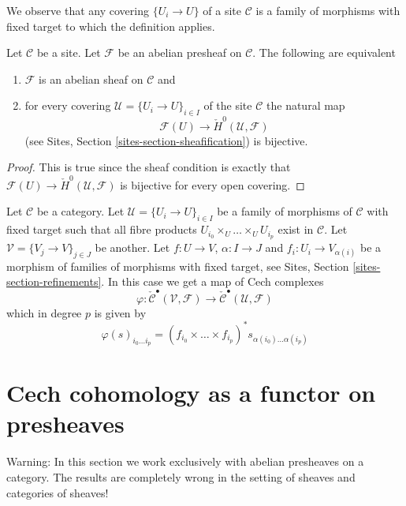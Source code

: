 \noindent
We observe that any covering $\{U_i \to U\}$ of a site $\mathcal{C}$
is a family of morphisms with fixed target to which the definition applies.

\begin{lemma}
\label{lemma-cech-h0}
Let $\mathcal{C}$ be a site.
Let $\mathcal{F}$ be an abelian presheaf on $\mathcal{C}$.
The following are equivalent
\begin{enumerate}
\item $\mathcal{F}$ is an abelian sheaf on $\mathcal{C}$ and
\item for every covering $\mathcal{U} = \{U_i \to U\}_{i \in I}$
of the site $\mathcal{C}$ the natural map
$$
\mathcal{F}(U) \to \check{H}^0(\mathcal{U}, \mathcal{F})
$$
(see Sites, Section \ref{sites-section-sheafification}) is bijective.
\end{enumerate}
\end{lemma}

\begin{proof}
This is true since the sheaf condition is exactly that
$\mathcal{F}(U) \to \check{H}^0(\mathcal{U}, \mathcal{F})$
is bijective for every open covering.
\end{proof}

\noindent
Let $\mathcal{C}$ be a category. Let $\mathcal{U} = \{U_i \to U\}_{i\in I}$
be a family of morphisms of $\mathcal{C}$ with fixed target such that
all fibre products $U_{i_0} \times_U \ldots \times_U U_{i_p}$ exist in
$\mathcal{C}$. Let $\mathcal{V} = \{V_j \to V\}_{j\in J}$ be another.
Let $f : U \to V$, $\alpha : I \to J$ and $f_i : U_i \to V_{\alpha(i)}$
be a morphism of families of morphisms with fixed target, see
Sites, Section \ref{sites-section-refinements}.
In this case we get a map of Cech complexes
\begin{equation}
\label{equation-map-cech-complexes}
\varphi : \check{\mathcal{C}}^\bullet(\mathcal{V}, \mathcal{F})
\longrightarrow
\check{\mathcal{C}}^\bullet(\mathcal{U}, \mathcal{F})
\end{equation}
which in degree $p$ is given by
$$
\varphi(s)_{i_0 \ldots i_p} =
(f_{i_0} \times \ldots \times f_{i_p})^*s_{\alpha(i_0) \ldots \alpha(i_p)}
$$


\section{Cech cohomology as a functor on presheaves}
\label{section-cech-functor}

\noindent
Warning: In this section we work exclusively with abelian presheaves
on a category. The results are completely wrong in the
setting of sheaves and categories of sheaves!

